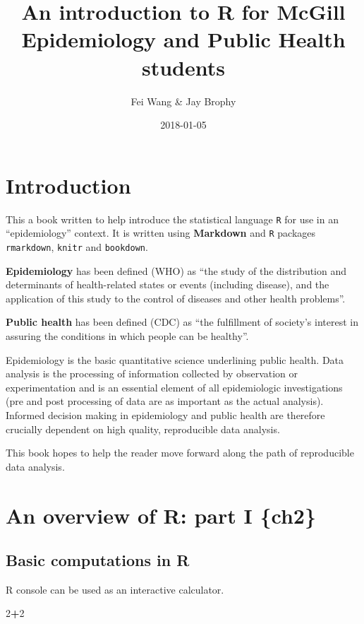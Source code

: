 \documentclass[]{book}
\title{An introduction to R for McGill Epidemiology and Public Health students}
\author{Fei Wang \& Jay Brophy}
\date{2018-01-05}
\newenvironment{Shaded}{\begin{snugshade}}{\end{snugshade}}
\newcommand{\DecValTok}[1]{\textcolor[rgb]{0.00,0.00,0.81}{#1}}
\newcommand{\OperatorTok}[1]{\textcolor[rgb]{0.81,0.36,0.00}{\textbf{#1}}}
\theoremstyle{definition}
\theoremstyle{definition}
\theoremstyle{definition}
\theoremstyle{remark}
\begin{document}
\maketitle

{
\setcounter{tocdepth}{1}
\tableofcontents
}
\chapter{Introduction}\label{introduction}

This a book written to help introduce the statistical language
\texttt{R} for use in an ``epidemiology'' context. It is written using
\textbf{Markdown} and \texttt{R} packages \texttt{rmarkdown},
\texttt{knitr} and \texttt{bookdown}.

\textbf{Epidemiology} has been defined (WHO) as ``the study of the
distribution and determinants of health-related states or events
(including disease), and the application of this study to the control of
diseases and other health problems''.

\textbf{Public health} has been defined (CDC) as ``the fulfillment of
society's interest in assuring the conditions in which people can be
healthy''.

Epidemiology is the basic quantitative science underlining public
health. Data analysis is the processing of information collected by
observation or experimentation and is an essential element of all
epidemiologic investigations (pre and post processing of data are as
important as the actual analysis). Informed decision making in
epidemiology and public health are therefore crucially dependent on high
quality, reproducible data analysis.

This book hopes to help the reader move forward along the path of
reproducible data analysis.

\chapter{An overview of R: part I
\{ch2\}}\label{an-overview-of-r-part-i-ch2}

\section{Basic computations in R}\label{basic-computations-in-r}

R console can be used as an interactive calculator.

\begin{Shaded}
\begin{Highlighting}[]
\DecValTok{2}\OperatorTok{+}\DecValTok{2}
\end{Highlighting}
\end{Shaded}
\end{document}
